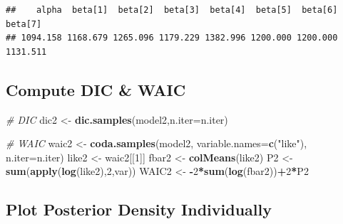 \documentclass[
]{article}
\newenvironment{Shaded}{\begin{snugshade}}{\end{snugshade}}
\newcommand{\AttributeTok}[1]{\textcolor[rgb]{0.13,0.29,0.53}{#1}}
\newcommand{\CommentTok}[1]{\textcolor[rgb]{0.56,0.35,0.01}{\textit{#1}}}
\newcommand{\DecValTok}[1]{\textcolor[rgb]{0.00,0.00,0.81}{#1}}
\newcommand{\FunctionTok}[1]{\textcolor[rgb]{0.13,0.29,0.53}{\textbf{#1}}}
\newcommand{\NormalTok}[1]{#1}
\newcommand{\OtherTok}[1]{\textcolor[rgb]{0.56,0.35,0.01}{#1}}
\newcommand{\SpecialCharTok}[1]{\textcolor[rgb]{0.81,0.36,0.00}{\textbf{#1}}}
\newcommand{\StringTok}[1]{\textcolor[rgb]{0.31,0.60,0.02}{#1}}
\begin{document}
\begin{Shaded}
\end{Shaded}

\begin{verbatim}
##    alpha  beta[1]  beta[2]  beta[3]  beta[4]  beta[5]  beta[6]  beta[7] 
## 1094.158 1168.679 1265.096 1179.229 1382.996 1200.000 1200.000 1131.511
\end{verbatim}

\subsection{Compute DIC \& WAIC}\label{compute-dic-waic-1}

\begin{Shaded}
\begin{Highlighting}[]
\CommentTok{\# DIC}
\NormalTok{dic2 }\OtherTok{\textless{}{-}} \FunctionTok{dic.samples}\NormalTok{(model2,}\AttributeTok{n.iter=}\NormalTok{n.iter)}

\CommentTok{\# WAIC}
\NormalTok{waic2 }\OtherTok{\textless{}{-}} \FunctionTok{coda.samples}\NormalTok{(model2, }\AttributeTok{variable.names=}\FunctionTok{c}\NormalTok{(}\StringTok{"like"}\NormalTok{), }\AttributeTok{n.iter=}\NormalTok{n.iter)}
\NormalTok{like2 }\OtherTok{\textless{}{-}}\NormalTok{ waic2[[}\DecValTok{1}\NormalTok{]]}
\NormalTok{fbar2 }\OtherTok{\textless{}{-}} \FunctionTok{colMeans}\NormalTok{(like2)}
\NormalTok{P2 }\OtherTok{\textless{}{-}} \FunctionTok{sum}\NormalTok{(}\FunctionTok{apply}\NormalTok{(}\FunctionTok{log}\NormalTok{(like2),}\DecValTok{2}\NormalTok{,var))}
\NormalTok{WAIC2 }\OtherTok{\textless{}{-}} \SpecialCharTok{{-}}\DecValTok{2}\SpecialCharTok{*}\FunctionTok{sum}\NormalTok{(}\FunctionTok{log}\NormalTok{(fbar2))}\SpecialCharTok{+}\DecValTok{2}\SpecialCharTok{*}\NormalTok{P2}
\end{Highlighting}
\end{Shaded}

\subsection{Plot Posterior Density
Individually}\label{plot-posterior-density-individually-1}
\end{document}
